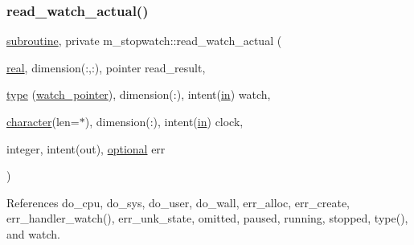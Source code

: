 \subsubsection{\texorpdfstring{read\+\_\+watch\+\_\+actual()}{read\_watch\_actual()}}
{\footnotesize\ttfamily \hyperlink{M__stopwatch_83_8txt_acfbcff50169d691ff02d4a123ed70482}{subroutine}, private m\+\_\+stopwatch\+::read\+\_\+watch\+\_\+actual (\begin{DoxyParamCaption}\item[{\hyperlink{read__watch_83_8txt_abdb62bde002f38ef75f810d3a905a823}{real}, dimension(\+:,\+:), pointer}]{read\+\_\+result,  }\item[{\hyperlink{stop__watch_83_8txt_a70f0ead91c32e25323c03265aa302c1c}{type} (\hyperlink{structm__stopwatch_1_1watch__pointer}{watch\+\_\+pointer}), dimension(\+:), intent(\hyperlink{M__journal_83_8txt_afce72651d1eed785a2132bee863b2f38}{in})}]{watch,  }\item[{\hyperlink{option__stopwatch_83_8txt_abd4b21fbbd175834027b5224bfe97e66}{character}(len=$\ast$), dimension(\+:), intent(\hyperlink{M__journal_83_8txt_afce72651d1eed785a2132bee863b2f38}{in})}]{clock,  }\item[{integer, intent(out), \hyperlink{option__stopwatch_83_8txt_aa4ece75e7acf58a4843f70fe18c3ade5}{optional}}]{err }\end{DoxyParamCaption})\hspace{0.3cm}{\ttfamily [private]}}



References do\+\_\+cpu, do\+\_\+sys, do\+\_\+user, do\+\_\+wall, err\+\_\+alloc, err\+\_\+create, err\+\_\+handler\+\_\+watch(), err\+\_\+unk\+\_\+state, omitted, paused, running, stopped, type(), and watch.

\mbox{\label{namespacem__stopwatch_a281bc81f897b1e58da49f7fbfa9f304e}} 
